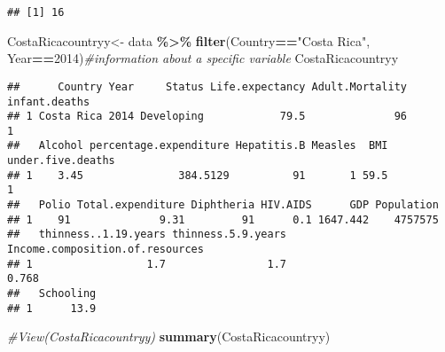 \documentclass[
]{article}
\newenvironment{Shaded}{\begin{snugshade}}{\end{snugshade}}
\newcommand{\CommentTok}[1]{\textcolor[rgb]{0.56,0.35,0.01}{\textit{#1}}}
\newcommand{\DecValTok}[1]{\textcolor[rgb]{0.00,0.00,0.81}{#1}}
\newcommand{\FunctionTok}[1]{\textcolor[rgb]{0.13,0.29,0.53}{\textbf{#1}}}
\newcommand{\NormalTok}[1]{#1}
\newcommand{\OtherTok}[1]{\textcolor[rgb]{0.56,0.35,0.01}{#1}}
\newcommand{\SpecialCharTok}[1]{\textcolor[rgb]{0.81,0.36,0.00}{\textbf{#1}}}
\newcommand{\StringTok}[1]{\textcolor[rgb]{0.31,0.60,0.02}{#1}}
\begin{document}
\begin{Shaded}
\end{Shaded}

\begin{verbatim}
## [1] 16
\end{verbatim}

\begin{Shaded}
\begin{Highlighting}[]
\NormalTok{CostaRicacountryy}\OtherTok{\textless{}{-}}\NormalTok{  data }\SpecialCharTok{\%\textgreater{}\%}
  \FunctionTok{filter}\NormalTok{(Country}\SpecialCharTok{==}\StringTok{"Costa Rica"}\NormalTok{,}
\NormalTok{         Year}\SpecialCharTok{==}\DecValTok{2014}\NormalTok{)}\CommentTok{\#information about a specific variable}
\NormalTok{CostaRicacountryy}
\end{Highlighting}
\end{Shaded}

\begin{verbatim}
##      Country Year     Status Life.expectancy Adult.Mortality infant.deaths
## 1 Costa Rica 2014 Developing            79.5              96             1
##   Alcohol percentage.expenditure Hepatitis.B Measles  BMI under.five.deaths
## 1    3.45               384.5129          91       1 59.5                 1
##   Polio Total.expenditure Diphtheria HIV.AIDS      GDP Population
## 1    91              9.31         91      0.1 1647.442    4757575
##   thinness..1.19.years thinness.5.9.years Income.composition.of.resources
## 1                  1.7                1.7                           0.768
##   Schooling
## 1      13.9
\end{verbatim}

\begin{Shaded}
\begin{Highlighting}[]
\CommentTok{\#View(CostaRicacountryy)}
\FunctionTok{summary}\NormalTok{(CostaRicacountryy)}
\end{Highlighting}
\end{Shaded}
\end{document}
